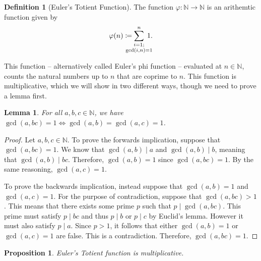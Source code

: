 \documentclass[a4paper]{article}
\newtheorem{lemma}[theorem]{Lemma}
\newtheorem{proposition}[theorem]{Proposition}
\theoremstyle{definition}
\newtheorem{definition}{Definition}
\begin{document}
\begin{definition}[Euler's Totient Function]
    The function $\varphi\colon \mathbb{N} \to \mathbb{N}$ is an arithemtic function given by
    \begin{equation}
        \varphi(n) \coloneq \sum_{\mathclap{\substack{i=1;\\ \gcd(i,n)=1}}}^n \; 1.
    \end{equation}
\end{definition}
This function -- alternatively called Euler's phi function -- evaluated at $n \in \mathbb{N}$, counts the natural numbers up to $n$ that are coprime to $n$.
This function is multiplicative, which we will show in two different ways, though we need to prove a lemma first.
\begin{lemma} \label{thm:gcd lemma}
    For all $a,b,c \in \mathbb{N}$, we have $\gcd(a,bc) = 1 \iff \gcd(a,b) = \gcd(a,c) = 1$.
\end{lemma}
\begin{proof}
    Let $a,b,c \in \mathbb{N}$.
    To prove the forwards implication, suppose that $\gcd(a,bc) \allowbreak = 1$.
    We know that $\gcd(a,b) \mid a$ and $\gcd(a,b) \mid b$, meaning that $\gcd(a,b) \mid bc$.
    Therefore, $\gcd(a,b) = 1$ since $\gcd(a,bc) = 1$.
    By the same reasoning, $\gcd(a,c) = 1$.

    To prove the backwards implication, instead suppose that $\gcd(a,b) = 1$ and $\gcd(a,c) = 1$.
    For the purpose of contradiction, suppose that $\gcd(a,bc) > 1$.
    This means that there exists some prime $p$ such that $p \mid \gcd(a,bc)$.
    This prime must satisfy $p \mid bc$ and thus $p \mid b$ or $p \mid c$ by Euclid's lemma.
    However it must also satisfy $p \mid a$.
    Since $p > 1$, it follows that either $\gcd(a,b) = 1$ or $\gcd(a,c) = 1$ are false.
    This is a contradiction.
    Therefore, $\gcd(a,bc) = 1$.
\end{proof}
\begin{proposition}
    Euler's Totient function is multiplicative.
\end{proposition}
\end{document}
